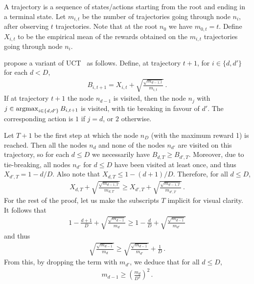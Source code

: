 \documentclass[a4paper]{article}
\begin{document}
A trajectory is a sequence of states/actions starting from the root and ending in a terminal state.
Let $m_{i,t}$ be the number of trajectories going through node $n_i$, after observing $t$ trajectories.
Note that at the root $n_0$ we have $m_{0,t} = t$.
Define $X_{i,t}$ to be the empirical mean of the rewards obtained
on the $m_{i,t}$ trajectories going through node $n_i$.

\citet{coquelin2007bandit} propose a variant of UCT~\citep{kocsis2006uct} as follows.
Define, at trajectory $t+1$, for $i\in\{d,d'\}$ for each $d< D$,
\begin{align}
    B_{i,t+1} = X_{i,t} + \sqrt{\frac{\sqrt{m_{d-1,t}}}{m_{i,t}}}\,.
\end{align}
If at trajectory $t+1$ the node $n_{d-1}$ is visited,
then the node $n_j$ with $j\in\operatorname*{argmax}_{i\in\{d, d'\}} B_{i,t+1}$ is visited,
with tie breaking in favour of $d'$.
The corresponding action is $1$ if $j=d$, or $2$ otherwise.

Let $T+1$ be the first step at which the node $n_D$ (with the maximum reward 1) is reached.
Then all the nodes $n_d$ and none of the nodes $n_{d'}$ are visited on this trajectory,
so for each $d\leq D$ we necessarily have $B_{d,T} \geq B_{d', T}$.
Moreover, due to tie-breaking, all nodes $n_{d'}$ for $d\leq D$ have been visited at least once, and thus $X_{d',T} = 1- d/D$.
Also note that $X_{d,T} \leq 1-(d+1)/D$.
Therefore, for all $d\leq D$,
\begin{align}
    X_{d,T} + \sqrt{\frac{\sqrt{m_{d-1,T}}}{m_{d,T}}}
    \geq 
    X_{d',T} + \sqrt{\frac{\sqrt{m_{d-1,T}}}{m_{d',T}}}\,.
\end{align}
For the rest of the proof, let us make the subscripts $T$ implicit for visual clarity.
It follows that
\begin{align}
    1-\frac{d+1}{D} + \sqrt{\frac{\sqrt{m_{d-1}}}{m_{d}}}
    \geq 
    1-\frac{d}{D} + \sqrt{\frac{\sqrt{m_{d-1}}}{m_{d'}}}
\end{align}
and thus
\begin{align}\label{eq:rec}
    \sqrt{\frac{\sqrt{m_{d-1}}}{m_{d}}}
    \geq \sqrt{\frac{\sqrt{m_{d-1}}}{m_{d'}}} + \frac1D\,.
\end{align}
From this, by dropping the term with $m_{d'}$, we deduce that for all $d\leq D$,
\begin{align}\label{eq:rec_square}
    m_{d-1} \geq \left(\frac{m_d}{D^2}\right)^2\,.
\end{align}
\end{document}
